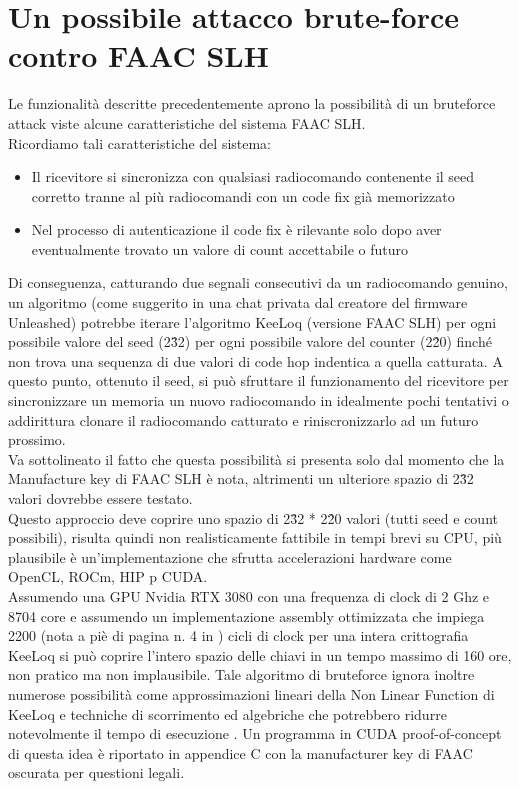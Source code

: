 \section{Un possibile attacco brute-force contro FAAC SLH}
\label{sec:attack}

Le funzionalità descritte precedentemente aprono la possibilità di un bruteforce attack viste alcune caratteristiche del sistema FAAC SLH.\\
Ricordiamo tali caratteristiche del sistema:
\begin{itemize}
  \item Il ricevitore si sincronizza con qualsiasi radiocomando contenente il seed corretto tranne al più radiocomandi con un code fix già memorizzato
  \item Nel processo di autenticazione il code fix è rilevante solo dopo aver eventualmente trovato un valore di count accettabile o futuro
\end{itemize}
Di conseguenza, catturando due segnali consecutivi da un radiocomando genuino, un algoritmo (come suggerito in una chat privata dal creatore del firmware Unleashed) potrebbe iterare l’algoritmo KeeLoq (versione FAAC SLH) per ogni possibile valore del seed (2\^32) per ogni possibile valore del counter (2\^20) finché non trova una sequenza di due valori di code hop indentica a quella catturata. A questo punto, ottenuto il seed, si può sfruttare il funzionamento del ricevitore per sincronizzare un memoria un nuovo radiocomando in idealmente pochi tentativi o addirittura clonare il radiocomando catturato e riniscronizzarlo ad un futuro prossimo.\\
Va sottolineato il fatto che questa possibilità si presenta solo dal momento che la Manufacture key di FAAC SLH è nota, altrimenti un ulteriore spazio di 2\^32 valori dovrebbe essere testato.\\
Questo approccio deve coprire uno spazio di 2\^32 * 2\^20 valori (tutti seed e count possibili), risulta quindi non realisticamente fattibile in tempi brevi su CPU, più plausibile è un’implementazione che sfrutta accelerazioni hardware come OpenCL, ROCm, HIP p CUDA.\\
Assumendo una GPU Nvidia RTX 3080 con una frequenza di clock di 2 Ghz e 8704 core e assumendo un implementazione assembly ottimizzata che impiega 2200 (nota a piè di pagina n. 4 in \cite{cryptoeprint}) cicli di clock per una intera crittografia KeeLoq si può coprire l’intero spazio delle chiavi in un tempo massimo di 160 ore, non pratico ma non implausibile. Tale algoritmo di bruteforce ignora inoltre numerose possibilità come approssimazioni lineari della Non Linear Function di KeeLoq e techniche di scorrimento ed algebriche che potrebbero ridurre notevolmente il tempo di esecuzione \cite{cryptoeprint,algebraic_slide,attack,periodic_ciphers}.
Un programma in CUDA proof-of-concept di questa idea è riportato in appendice C con la manufacturer key di FAAC oscurata per questioni legali.
